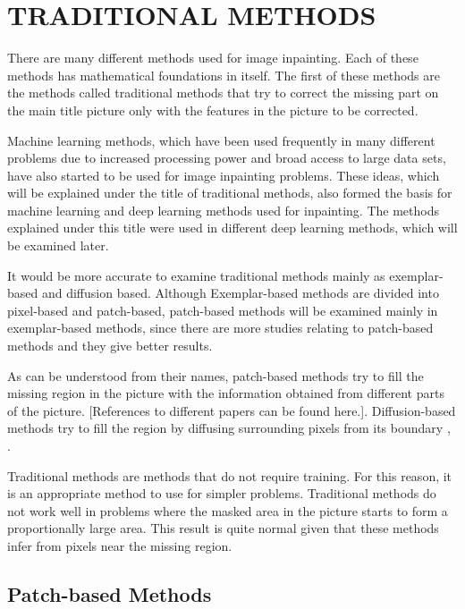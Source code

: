 \chapter{TRADITIONAL METHODS}\label{traditional_methods}

There are many different methods used for image inpainting. Each of these methods has mathematical foundations in itself. The first of these methods are the methods called traditional methods that try to correct the missing part on the main title picture only with the features in the picture to be corrected.

Machine learning methods, which have been used frequently in many different problems due to increased processing power and broad access to large data sets, have also started to be used for image inpainting problems. These ideas, which will be explained under the title of traditional methods, also formed the basis for machine learning and deep learning methods used for inpainting. The methods explained under this title were used in different deep learning methods, which will be examined later.

It would be more accurate to examine traditional methods mainly as exemplar-based and diffusion based. Although Exemplar-based methods are divided into pixel-based and patch-based, patch-based methods will be examined mainly in exemplar-based methods, since there are more studies relating to patch-based methods and they give better results.

As can be understood from their names, patch-based methods try to fill the missing region in the picture with the information obtained from different parts of the picture. [References to different papers can be found here.]. Diffusion-based methods try to fill the region by diffusing surrounding pixels from its boundary \cite{navier_stokes_inpainting}, \cite{telea}.

Traditional methods are methods that do not require training. For this reason, it is an appropriate method to use for simpler problems. Traditional methods do not work well in problems where the masked area in the picture starts to form a proportionally large area. This result is quite normal given that these methods infer from pixels near the missing region.

\section{Patch-based Methods}

